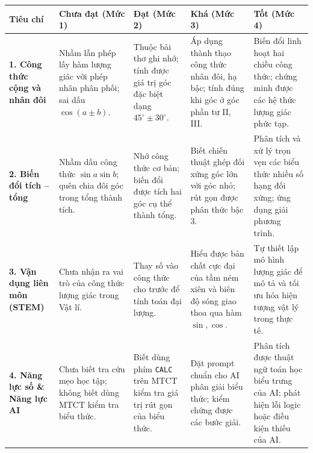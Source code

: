 \documentclass[12pt, a4paper]{article}
\begin{document}
\begin{table}[h!]
\centering
\small
\begin{tabularx}{\textwidth}{|p{2.8cm}|X|X|X|X|}
\hline
\textbf{Tiêu chí} & \textbf{Chưa đạt (Mức 1)} & \textbf{Đạt (Mức 2)} & \textbf{Khá (Mức 3)} & \textbf{Tốt (Mức 4)} \\
\hline
\textbf{1. Công thức cộng và nhân đôi} & Nhầm lẫn phép lấy hàm lượng giác với phép nhân phân phối; sai dấu $\cos(a \pm b)$. & Thuộc bài thơ ghi nhớ; tính được giá trị góc đặc biệt dạng $45^\circ \pm 30^\circ$. & Áp dụng thành thạo công thức nhân đôi, hạ bậc; tính đúng khi góc ở góc phần tư II, III. & Biến đổi linh hoạt hai chiều công thức; chứng minh được các hệ thức lượng giác phức tạp. \\
\hline
\textbf{2. Biến đổi tích -- tổng} & Nhầm dấu công thức $\sin a \sin b$; quên chia đôi góc trong tổng thành tích. & Nhớ công thức cơ bản; biến đổi được tích hai góc cụ thể thành tổng. & Biết chiến thuật ghép đối xứng góc lớn với góc nhỏ; rút gọn được phân thức bậc 3. & Phân tích và xử lý trọn vẹn các biểu thức nhiều số hạng đối xứng; ứng dụng giải phương trình. \\
\hline
\textbf{3. Vận dụng liên môn (STEM)} & Chưa nhận ra vai trò của công thức lượng giác trong Vật lí. & Thay số vào công thức cho trước để tính toán đại lượng. & Hiểu được bản chất cực đại của tầm ném xiên và biên độ sóng giao thoa qua hàm $\sin, \cos$. & Tự thiết lập mô hình lượng giác để mô tả và tối ưu hóa hiện tượng vật lý trong thực tế. \\
\hline
\textbf{4. Năng lực số \& Năng lực AI} & Chưa biết tra cứu mẹo học tập; không biết dùng MTCT kiểm tra biểu thức. & Biết dùng phím \texttt{CALC} trên MTCT kiểm tra giá trị rút gọn của biểu thức. & Đặt prompt chuẩn cho AI phân giải biểu thức; kiểm chứng được các bước giải. & Phân tích được thuật ngữ toán học biểu trưng của AI; phát hiện lỗi logic hoặc điều kiện thiếu của AI. \\
\hline
\end{tabularx}
\end{table}
\end{document}
